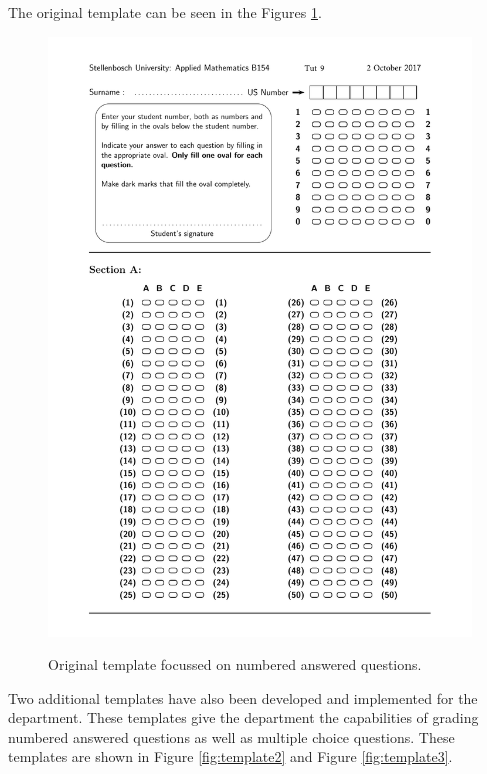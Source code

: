 The original template can be seen in the Figures \ref{fig:template1}. 
\begin{figure}
  \centering
  \includegraphics[width=12cm]{template1}\\
  \caption{Original template focussed on numbered answered questions.}
  \label{fig:template1}
\end{figure}
Two additional templates have also been developed and implemented for the department. These templates give the department the capabilities of grading numbered answered questions as well as multiple choice questions. These templates are shown in Figure \ref{fig:template2} and Figure \ref{fig:template3}.

